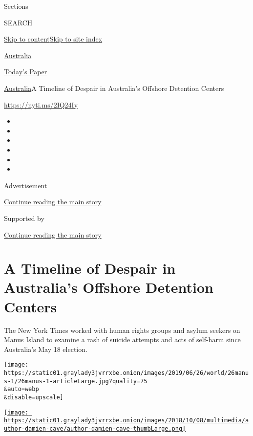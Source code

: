 Sections

SEARCH

\protect\hyperlink{site-content}{Skip to
content}\protect\hyperlink{site-index}{Skip to site index}

\href{https://www.nytimes3xbfgragh.onion/section/world/australia}{Australia}

\href{https://myaccount.nytimes3xbfgragh.onion/auth/login?response_type=cookie\&client_id=vi}{}

\href{https://www.nytimes3xbfgragh.onion/section/todayspaper}{Today's
Paper}

\href{/section/world/australia}{Australia}\textbar{}A Timeline of
Despair in Australia's Offshore Detention Centers

\href{https://nyti.ms/2IQ24Iy}{https://nyti.ms/2IQ24Iy}

\begin{itemize}
\item
\item
\item
\item
\item
\item
\end{itemize}

Advertisement

\protect\hyperlink{after-top}{Continue reading the main story}

Supported by

\protect\hyperlink{after-sponsor}{Continue reading the main story}

\hypertarget{a-timeline-of-despair-in-australias-offshore-detention-centers}{%
\section{A Timeline of Despair in Australia's Offshore Detention
Centers}\label{a-timeline-of-despair-in-australias-offshore-detention-centers}}

The New York Times worked with human rights groups and asylum seekers on
Manus Island to examine a rash of suicide attempts and acts of self-harm
since Australia's May 18 election.

\texttt{[image: https://static01.graylady3jvrrxbe.onion/images/2019/06/26/world/26manus-1/26manus-1-articleLarge.jpg?quality=75\\\&auto=webp\\\&disable=upscale]}

\href{https://www.nytimes3xbfgragh.onion/by/damien-cave}{\texttt{[image: https://static01.graylady3jvrrxbe.onion/images/2018/10/08/multimedia/author-damien-cave/author-damien-cave-thumbLarge.png]}}

